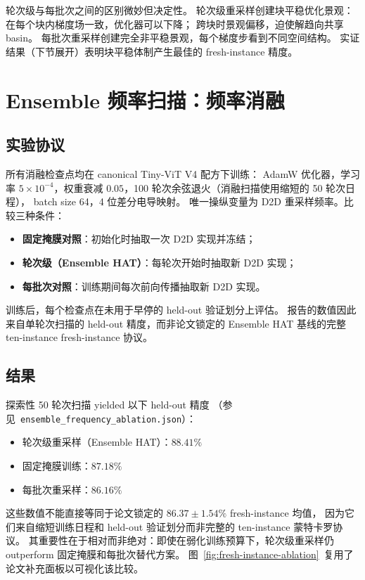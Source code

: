 轮次级与每批次之间的区别微妙但决定性。
轮次级重采样创建块平稳优化景观：在每个块内梯度场一致，优化器可以下降；
跨块时景观偏移，迫使解趋向共享 basin。
每批次重采样创建完全非平稳景观，每个梯度步看到不同空间结构。
实证结果（下节展开）表明块平稳体制产生最佳的 fresh-instance 精度。

\section{Ensemble 频率扫描：频率消融}
\label{sec:frequency-sweep}

\subsection{实验协议}

所有消融检查点均在 canonical Tiny-ViT V4 配方下训练：
AdamW 优化器，学习率 $5\times10^{-4}$，权重衰减 $0.05$，100 轮次余弦退火（消融扫描使用缩短的 50 轮次日程），
batch size 64，4 位差分电导映射。
唯一操纵变量为 D2D 重采样频率。比较三种条件：
\begin{itemize}[leftmargin=1.4em]
    \item \textbf{固定掩膜对照}：初始化时抽取一次 D2D 实现并冻结；
    \item \textbf{轮次级（Ensemble HAT）}：每轮次开始时抽取新 D2D 实现；
    \item \textbf{每批次对照}：训练期间每次前向传播抽取新 D2D 实现。
\end{itemize}

训练后，每个检查点在未用于早停的 held-out 验证划分上评估。
报告的数值因此来自单轮次扫描的 held-out 精度，而非论文锁定的 Ensemble HAT 基线的完整 ten-instance fresh-instance 协议。

\subsection{结果}

探索性 50 轮次扫描 yielded 以下 held-out 精度
（参见~\texttt{ensemble\_frequency\_ablation.json}）：
\begin{itemize}[leftmargin=1.4em]
    \item 轮次级重采样（Ensemble HAT）：$\mathbf{88.41\%}$
    \item 固定掩膜训练：$\mathbf{87.18\%}$
    \item 每批次重采样：$\mathbf{86.16\%}$
\end{itemize}

这些数值不能直接等同于论文锁定的 $86.37\pm1.54\%$ fresh-instance 均值，
因为它们来自缩短训练日程和 held-out 验证划分而非完整的 ten-instance 蒙特卡罗协议。
其重要性在于相对而非绝对：即使在弱化训练预算下，轮次级重采样仍 outperform 固定掩膜和每批次替代方案。
图~\ref{fig:fresh-instance-ablation}~复用了论文补充面板以可视化该比较。

